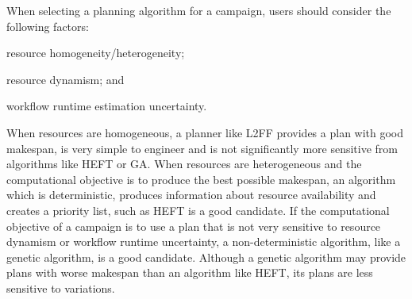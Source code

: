 When selecting a planning algorithm for a campaign, users should consider the following factors:
\begin{inparaenum}[1)]
    \item resource homogeneity/heterogeneity;
    \item resource dynamism; and
    \item workflow runtime estimation uncertainty.
\end{inparaenum}
When resources are homogeneous, a planner like L2FF provides a plan with good makespan, is very simple to engineer and is not significantly more sensitive from algorithms like HEFT or GA.
When resources are heterogeneous and the computational objective is to produce the best possible makespan, an algorithm which is deterministic, produces information about resource availability and creates a priority list, such as HEFT is a good candidate.
If the computational objective of a campaign is to use a plan that is not very sensitive to resource dynamism or workflow runtime uncertainty, a non-deterministic algorithm, like a genetic algorithm, is a good candidate.
Although a genetic algorithm may provide plans with worse makespan than an algorithm like HEFT, its plans are less sensitive to variations.



